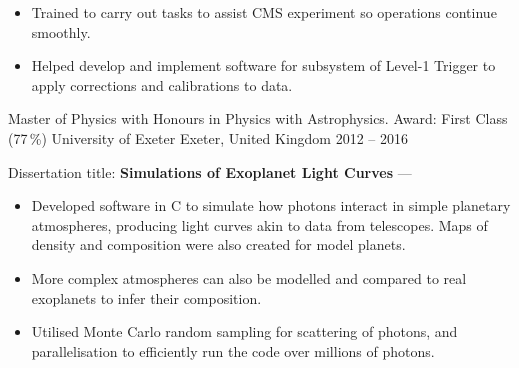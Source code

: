 \begin{cventries}
{\begin{cvitems}
            \vpaddingEduSubpoint
            \begin{itemize}
                \item[\bullet]{Trained to carry out tasks to assist CMS experiment so operations continue smoothly.}
                \vpaddingEduSubpoint
                \item[\bullet]{Helped develop and implement software for subsystem of Level-1 Trigger to apply corrections and calibrations to data.}
            \end{itemize}
        \end{cvitems}
        }

    \cventry
        {Master of Physics with Honours in Physics with Astrophysics. Award: First Class (77\,\%)}
        {University of Exeter}
        {Exeter, United Kingdom}
        {2012 -- 2016}
        {
        \begin{cvitems} %
            \item {Dissertation title: \textbf{Simulations of Exoplanet Light Curves} --- }
            \vpaddingEduSubpoint
            \begin{itemize}
                \item[\bullet]{Developed software in C to simulate how photons interact in simple planetary atmospheres, producing light curves akin to data from telescopes. Maps of density and composition were also created for model planets.}
                \vpaddingEduSubpoint
                \item[\bullet]{More complex atmospheres can also be modelled and compared to real exoplanets to infer their composition.}
                \vpaddingEduSubpoint
                \item[\bullet]{Utilised Monte Carlo random sampling for scattering of photons, and parallelisation to efficiently run the code over millions of photons.}
            \end{itemize}
        \end{cvitems}
        } %


\end{cventries}
